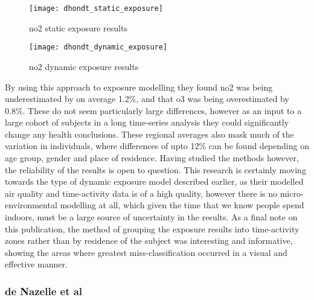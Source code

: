 \begin{figure}[H]
\centering
\texttt{[image: dhondt\_static\_exposure]}
\caption{\gls{no2} static exposure results}
\label{fig:dhondt_static_exposure}
\end{figure}

\begin{figure}[H]
\centering
\texttt{[image: dhondt\_dynamic\_exposure]}
\caption{\gls{no2} dynamic exposure results}
\label{fig:dhondt_dynamic_exposure}
\end{figure}

By using this approach to exposure modelling they found \gls{no2} was being underestimated by on average 1.2\%, and that \gls{o3} was being overestimated by 0.8\%. These do not seem particularly large differences, however as an input to a large cohort of subjects in a long time-series analysis they could significantly change any health conclusions. These regional averages also mask much of the variation in individuals, where differences of upto 12\% can be found depending on age group, gender and place of residence. Having studied the methods however, the reliability of the results is open to question. This research is certainly moving towards the type of dynamic exposure model described earlier, as their modelled air quality and time-activity data is of a high quality, however there is no micro-environmental modelling at all, which given the time that we know people spend indoors, must be a large source of uncertainty in the results. As a final note on this publication, the method of grouping the exposure results into time-activity zones rather than by residence of the subject was interesting and informative, showing the areas where greatest miss-classification occurred in a visual and effective manner.


\subsubsection{de Nazelle et al}
\label{sec:dynamic_models_denazelle}

